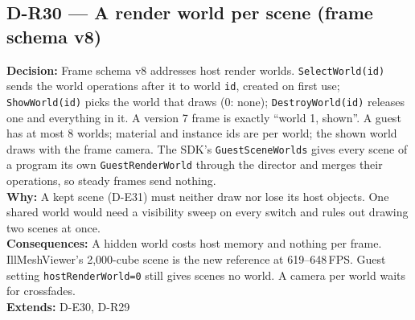 \subsection*{D-R30 --- A render world per scene (frame schema v8)}
\begin{decisionbox}[title={D-R30 \quad 2026-09-26}]
\textbf{Decision:} Frame schema v8 addresses host render worlds.
\texttt{SelectWorld(id)} sends the world operations after it to world
\texttt{id}, created on first use; \texttt{ShowWorld(id)} picks the world that
draws (0: none); \texttt{DestroyWorld(id)} releases one and everything in it.
A version 7 frame is exactly ``world 1, shown''. A guest has at most 8 worlds;
material and instance ids are per world; the shown world draws with the frame
camera. The SDK's \texttt{GuestSceneWorlds} gives every scene of a program its
own \texttt{GuestRenderWorld} through the director and merges their
operations, so steady frames send nothing.\\
\textbf{Why:} A kept scene (D-E31) must neither draw nor lose its host objects.
One shared world would need a visibility sweep on every switch and rules out
drawing two scenes at once.\\
\textbf{Consequences:} A hidden world costs host memory and nothing per frame.
IllMeshViewer's 2,000-cube scene is the new reference at 619--648\,FPS. Guest
setting \texttt{hostRenderWorld=0} still gives scenes no world. A camera per
world waits for crossfades.\\
\textbf{Extends:} D-E30, D-R29
\end{decisionbox}

